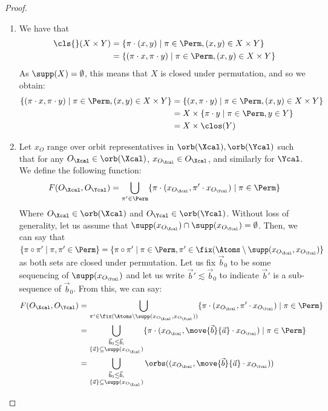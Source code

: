 \begin{proof}
\begin{enumerate}
	\item We have that 
	\begin{align*}
		\cls{}(X \times Y) &= \{\pi \cdot (x, y) \mid \pi \in \Perm, (x,y) \in X \times Y\}
		\\ &= \{(\pi \cdot x, \pi \cdot y) \mid \pi \in \Perm, (x, y) \in X \times Y\}
	\end{align*} 
	As $\supp(X) = \emptyset$, this means that $X$ is closed under permutation, and so we obtain:
	\begin{align*}
		\{(\pi \cdot x, \pi \cdot y) \mid \pi \in \Perm, (x, y) \in X \times Y\} &= \{(x, \pi \cdot y) \mid \pi \in \Perm, (x, y) \in X \times Y\}\\
		&= X \times \{\pi \cdot y \mid \pi \in \Perm, y \in Y\} \\ &= X\times \clos(Y)
	\end{align*}
	\item Let $x_{O}$ range over orbit representatives in $\orb(\Xcal), \orb(\Ycal)$ such that for any $O_\Xcal \in \orb(\Xcal)$, $x_{O_\Xcal} \in O_\Xcal$, and similarly for $\Ycal$.
	We define the following function:
	\[
	F(O_\Xcal, O_\Ycal) = \bigcup_{\pi' \in \Perm}\{\pi \cdot (x_{O_\Xcal}, \pi'\cdot x_{O_\Ycal}) \mid \pi \in \Perm\}
	\]
	Where $O_\Xcal \in \orb(\Xcal)$ and $O_\Ycal \in \orb(\Ycal)$. 
	Without loss of generality, let us assume that $\supp(x_{O_\Xcal}) \cap \supp(x_{O_\Ycal}) = \emptyset$. 
	Then, we can say that $\{\pi \circ \pi' \mid \pi, \pi' \in \Perm\} = \{\pi \circ \pi' \mid \pi \in \Perm, \pi' \in \fix(\Atoms \setminus \supp(x_{O_\Xcal}, x_{O_\Ycal})\}$ as both sets are closed under permutation.  
	Let us fix $\vec b_0$ to be some sequencing of $\supp(x_{O_\Ycal})$ and let us write $\vec b' \lesssim \vec b_0$ to indicate $\vec b'$ is a sub-sequence of $\vec b_0$.
	From this, we can say:
	\begin{align*}
		F(O_\Xcal, O_\Ycal) &= \bigcup_{\pi' \in \fix(\Atoms \setminus \supp(x_{O_\Xcal}, x_{O_\Ycal}))}\{\pi \cdot (x_{O_\Xcal}, \pi'\cdot x_{O_\Ycal}) \mid \pi \in \Perm\} \\
		&= \bigcup_{\substack{\vec b_0 \lesssim \vec b,\\ \{\vec a\} \subseteq \supp(x_{O_\Xcal})}} \{\pi \cdot (x_{O_\Xcal}, \move{\vec b}{\vec a}\cdot x_{O_\Ycal}) \mid \pi \in \Perm\} \\
		&= \bigcup_{\substack{\vec b_0 \lesssim \vec b,\\ \{\vec a\} \subseteq \supp(x_{O_\Xcal})}} \orbs((x_{O_\Xcal}, \move{\vec b}{\vec a}\cdot x_{O_\Ycal}))
	\end{align*}

\end{enumerate}
\end{proof}
